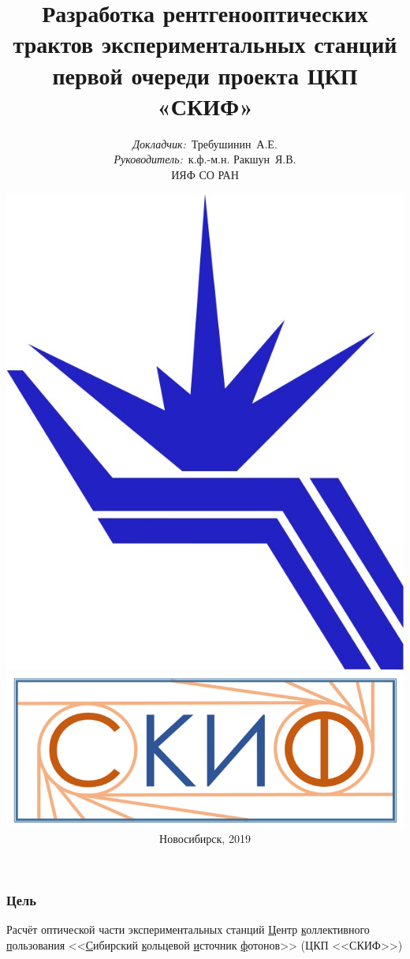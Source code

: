 \documentclass[14pt, hyperref = {colorlinks},xcolor=table ]{beamer}
\title{\small{Разработка рентгенооптических трактов экспериментальных станций первой очереди проекта ЦКП «СКИФ»}}
\author{\small{%
		\emph{Докладчик:}~Требушинин~А.Е.\\%
		\emph{Руководитель:}~к.ф.-м.н. Ракшун~Я.В.}\\%
	\vspace{30pt}%
  	ИЯФ СО РАН
	\vspace{-15pt}%
}
\date{\includegraphics[width=0.1\linewidth]{pic/logo.jpg} \hspace{20pt}
	\includegraphics[width=0.2\linewidth]{pic/SKIFlogo.png}\\
	
	\vspace{5pt}%
	\small{Новосибирск, 2019}}
\begin{document}
\maketitle

\small
\begin{frame}
\frametitle{Цель}\label{t1}
\begin{center}
	\large{Расчёт оптической части экспериментальных станций \underline{Ц}ентр \underline{к}оллективного \underline{п}ользования <<\underline{С}ибирский \underline{к}ольцевой \underline{и}сточник \underline{ф}отонов>> (ЦКП <<СКИФ>>) }
\end{center}
\end{frame}

\end{document}
